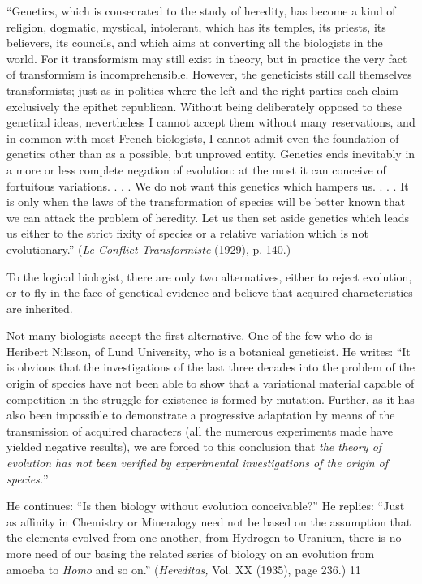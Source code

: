 ``Genetics, which is consecrated to the study of heredity, has become a kind of religion,
dogmatic, mystical, intolerant, which has its temples, its priests, its believers, its councils,
and which aims at converting all the biologists in the world. For it transformism may still
exist in theory, but in practice the very fact of transformism is incomprehensible. However,
the geneticists still call themselves transformists; just as in politics where the left and the
right parties each claim exclusively the epithet republican. Without being deliberately
opposed to these genetical ideas, nevertheless I cannot accept them without many
reservations, and in common with most French biologists, I cannot admit even the foundation
of genetics other than as a possible, but unproved entity. Genetics ends inevitably in a more
or less complete negation of evolution: at the most it can conceive of fortuitous variations. . .
. We do not want this genetics which hampers us. . . . It is only when the laws of the
transformation of species will be better known that we can attack the problem of heredity.
Let us then set aside genetics which leads us either to the strict fixity of species or a relative
variation which is not evolutionary.'' (\textit{Le Conflict Transformiste} (1929), p. 140.)

To the logical biologist, there are only two alternatives, either to reject evolution, or to fly in
the face of genetical evidence and believe that acquired characteristics are inherited.

Not many biologists accept the first alternative. One of the few who do is Heribert Nilsson,
of Lund University, who is a botanical geneticist. He writes: ``It is obvious that the
investigations of the last three decades into the problem of the origin of species have not been
able to show that a variational material capable of competition in the struggle for existence is
formed by mutation. Further, as it has also been impossible to demonstrate a progressive
adaptation by means of the transmission of acquired characters (all the numerous
experiments made have yielded negative results), we are forced to this conclusion that \textit{the
theory of evolution has not been verified by experimental investigations of the origin of
species.}''

He continues: ``Is then biology without evolution conceivable?'' He replies: ``Just as affinity
in Chemistry or Mineralogy need not be based on the assumption that the elements evolved
from one another, from Hydrogen to Uranium, there is no more need of our basing the related
series of biology on an evolution from amoeba to \textit{Homo} and so on.'' (\textit{Hereditas,} Vol. XX
(1935), page 236.) 11

